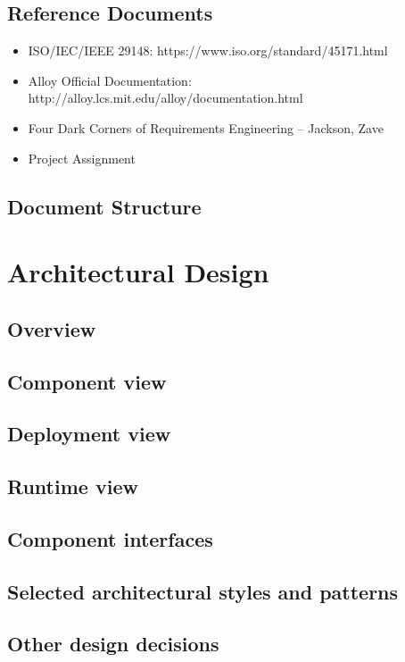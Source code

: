 \documentclass[titlepage]{article}
\begin{document}
	
\subsection{Reference Documents}

\begin{itemize}
   	\item ISO/IEC/IEEE 29148: https://www.iso.org/standard/45171.html
	\item Alloy Official Documentation: http://alloy.lcs.mit.edu/alloy/documentation.html
   	\item Four Dark Corners of Requirements Engineering – Jackson, Zave
	\item Project Assignment
\end{itemize}


\subsection{Document Structure}
\pagebreak



\section{Architectural Design}
\subsection{Overview}
\subsection{Component view}
\subsection{Deployment view}
\subsection{Runtime view}
\subsection{Component interfaces}
\subsection{Selected architectural styles and patterns}
\subsection{Other design decisions}
\pagebreak
\end{document}
